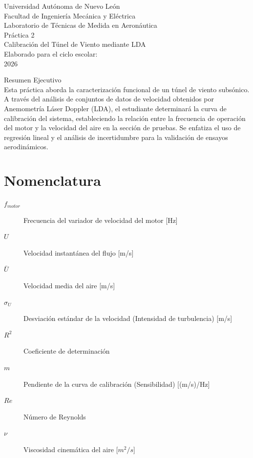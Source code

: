 \documentclass[11pt, a4paper]{article}
\begin{document}
\begin{titlepage}
    \centering
    {\LARGE Universidad Autónoma de Nuevo León}\\[0.5cm]
    {\Large Facultad de Ingeniería Mecánica y Eléctrica}\\[2cm]
    
    {\Large Laboratorio de Técnicas de Medida en Aeronáutica}\\[1cm]
    
    {\Huge Práctica 2}\\[0.5cm]
    {\Large Calibración del Túnel de Viento mediante LDA}\\[2cm]
    
    Elaborado para el ciclo escolar:\\
    2026\\[2cm]
    
    \vfill
    
    Resumen Ejecutivo\\
    Esta práctica aborda la caracterización funcional de un túnel de viento subsónico. A través del análisis de conjuntos de datos de velocidad obtenidos por Anemometría Láser Doppler (LDA), el estudiante determinará la curva de calibración del sistema, estableciendo la relación entre la frecuencia de operación del motor y la velocidad del aire en la sección de pruebas. Se enfatiza el uso de regresión lineal y el análisis de incertidumbre para la validación de ensayos aerodinámicos.
\end{titlepage}

\tableofcontents
\newpage

\section*{Nomenclatura}
\begin{description}
    \item[$f_{motor}$] Frecuencia del variador de velocidad del motor [Hz]
    \item[$U$] Velocidad instantánea del flujo [m/s]
    \item[$\bar{U}$] Velocidad media del aire [m/s]
    \item[$\sigma_U$] Desviación estándar de la velocidad (Intensidad de turbulencia) [m/s]
    \item[$R^2$] Coeficiente de determinación
    \item[$m$] Pendiente de la curva de calibración (Sensibilidad) [(m/s)/Hz]
    \item[$Re$] Número de Reynolds
    \item[$\nu$] Viscosidad cinemática del aire [$m^2/s$]
\end{description}
\end{document}
